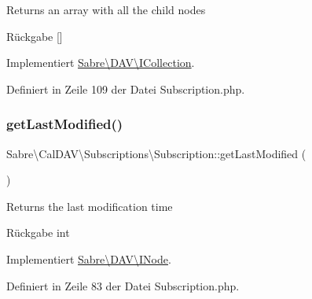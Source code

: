 Returns an array with all the child nodes

\begin{DoxyReturn}{Rückgabe}
\mbox{[}\mbox{]} 
\end{DoxyReturn}


Implementiert \mbox{\hyperlink{interface_sabre_1_1_d_a_v_1_1_i_collection_a5344a6890e49fd7a81bb0e38b4c6d0be}{Sabre\textbackslash{}\+D\+A\+V\textbackslash{}\+I\+Collection}}.



Definiert in Zeile 109 der Datei Subscription.\+php.

\mbox{\label{class_sabre_1_1_cal_d_a_v_1_1_subscriptions_1_1_subscription_ae3763fd7e77329dfdab8e45250af7285}} 
\subsubsection{\texorpdfstring{get\+Last\+Modified()}{getLastModified()}}
{\footnotesize\ttfamily Sabre\textbackslash{}\+Cal\+D\+A\+V\textbackslash{}\+Subscriptions\textbackslash{}\+Subscription\+::get\+Last\+Modified (\begin{DoxyParamCaption}{ }\end{DoxyParamCaption})}

Returns the last modification time

\begin{DoxyReturn}{Rückgabe}
int 
\end{DoxyReturn}


Implementiert \mbox{\hyperlink{interface_sabre_1_1_d_a_v_1_1_i_node_a06335f81c7d4ec2c6d9e327c8ce61014}{Sabre\textbackslash{}\+D\+A\+V\textbackslash{}\+I\+Node}}.



Definiert in Zeile 83 der Datei Subscription.\+php.

\mbox{\label{class_sabre_1_1_cal_d_a_v_1_1_subscriptions_1_1_subscription_afcc333214388d83a3c365965c45eebea}} 
